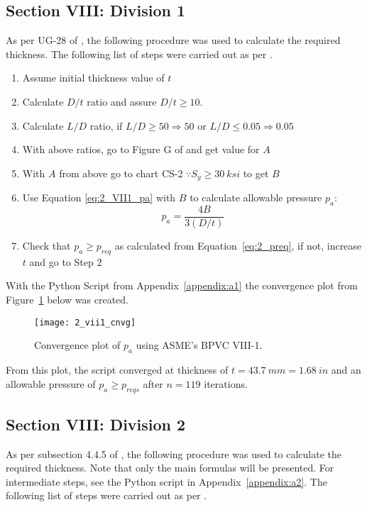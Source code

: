 \subsection{Section VIII: Division 1}
As per UG-28 of \cite{ASMEbvpcVII1}, the following procedure was used to calculate the required thickness.
The following list of steps were carried out as per \cite{ASMEbvpcVII1}.

\begin{enumerate}
	\item Assume initial thickness value of $t$
	\item Calculate $D/t$ ratio and assure $D/t \geq 10$.
	\item Calculate $L/D$ ratio, if $L/D \geq 50 \Rightarrow 50$ or  $L/D \leq 0.05 \Rightarrow 0.05$
	\item With above ratios, go to Figure G of \cite{ASMEbvpcIID} and get value for $A$
	\item With $A$ from above go to chart CS-2 $\because S_y \geq 30 \ ksi$ to get $B$
	\item Use Equation \ref{eq:2_VII1_pa} with $B$ to calculate allowable pressure $p_a$:
	      \begin{equation}
	      	\label{eq:2_VII1_pa}
	      	p_a = \frac{4B}{3 \left(D/t\right)}
	      \end{equation}
	\item Check that $p_a \geq p_{req}$ as calculated from Equation~\ref{eq:2_preq}, if not, increase $t$ and go to Step 2\\
	      	
\end{enumerate}

With the Python Script from Appendix~\ref{appendix:a1} the convergence plot from Figure~\ref{fig:2_vii1_cnvg} below was created.
\begin{figure}[H]
	\centering
	\texttt{[image: 2\_vii1\_cnvg]}
	\caption{Convergence plot of $p_a$ using ASME's BPVC VIII-1.}
	\label{fig:2_vii1_cnvg}
\end{figure}

From this plot, the script converged at thickness of $t = 43.7\ mm = 1.68\ in$ and an allowable pressure of $p_a\geq p_{reqs}$ after $n=119$ iterations. 


\subsection{Section VIII: Division 2}
As per subsection 4.4.5 of \cite{ASMEbvpcVII2}, the following procedure was used to calculate the required thickness. Note that only the main formulas will be presented. For intermediate steps, see  the Python script in Appendix~\ref{appendix:a2}. The following list of steps were carried out as per \cite{ASMEbvpcVII2}.

